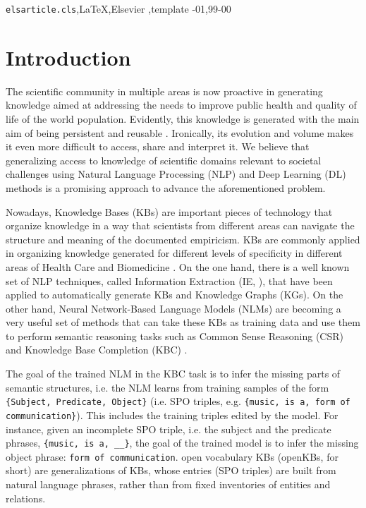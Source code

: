 \documentclass[preprint]{elsarticle}
\begin{document}
\begin{frontmatter}
\begin{keyword}
\texttt{elsarticle.cls}\sep \LaTeX\sep Elsevier \sep template
-01\sep  99-00
\end{keyword}

\end{frontmatter}


\section{Introduction}

The scientific community in multiple areas is now proactive in generating knowledge aimed at addressing the needs to improve public health and quality of life of the world population. Evidently, this knowledge is generated with the main aim of being persistent and reusable \cite{harper2018agbiodata}. Ironically, its evolution and volume makes it even more difficult to access, share and interpret it. We believe that generalizing access to knowledge of scientific domains relevant to societal challenges using Natural Language Processing (NLP) and Deep Learning (DL) methods is a promising approach to advance the aforementioned problem.


Nowadays, Knowledge Bases (KBs) are important pieces of technology that organize knowledge in a way that scientists from different areas can navigate the structure and meaning of the documented empiricism. KBs are commonly applied in organizing knowledge generated for different levels of specificity in different areas of Health Care and Biomedicine \cite{hunter2017knowledge}. On the one hand, there is a well known set of NLP techniques, called Information Extraction (IE, \cite{sheikhalishahi2019natural,yu2018artificial}), that have been applied to automatically generate KBs and Knowledge Graphs (KGs). On the other hand, Neural Network-Based Language Models (NLMs) are becoming a very useful set of methods that can take these KBs as training data and use them to perform semantic reasoning tasks such as Common Sense Reasoning (CSR) and Knowledge Base Completion (KBC) \cite{davis2015commonsense,socher2013reasoning}. 

The goal of the trained NLM in the KBC task is to infer the missing parts of semantic structures, i.e. the NLM learns from training samples of the form \texttt{\{Subject, Predicate, Object\}} (i.e. SPO triples, e.g. \texttt{\{music, is a, form of communication\}}). This includes the training triples edited by the model. For instance, given an incomplete SPO triple, i.e. the subject and the predicate phrases, \texttt{\{music, is a, \_\_\}}, the goal of the trained model is to infer the missing object phrase: \texttt{form of communication}. open vocabulary KBs (openKBs, for short) are generalizations of KBs, whose entries (SPO triples) are built from natural language phrases, rather than from fixed inventories of entities and relations.
\end{document}
